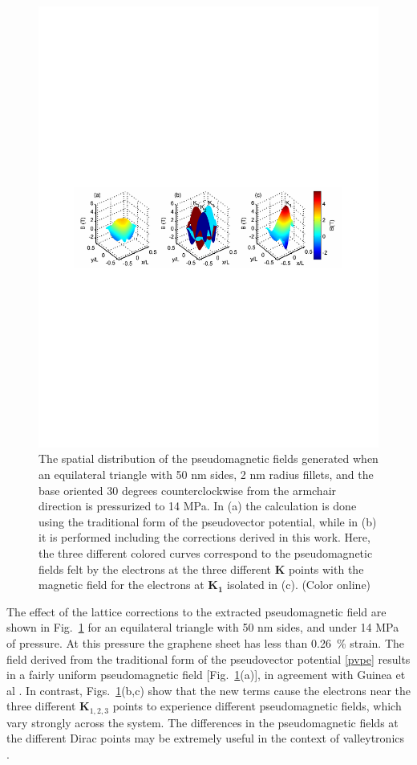 \begin{figure}
\includegraphics{Figs_PVP/figure_3.pdf}
\caption{\label{triholes}The spatial distribution of the pseudomagnetic fields generated when an equilateral triangle with 50 nm sides, 2 nm radius fillets, and the base oriented 30 degrees counterclockwise from the armchair direction is pressurized to 14 MPa. In (a) the calculation is done using the traditional form of the pseudovector potential, while in (b) it is performed including the corrections derived in this work. Here, the three different colored curves correspond to the pseudomagnetic fields felt by the electrons at the three different $\bm{K}$ points with the magnetic field for the electrons at $\bm{K_1}$ isolated in (c). (Color online)}
\end{figure}

The effect of the lattice corrections to the extracted pseudomagnetic field are shown in Fig.~\ref{triholes} for an equilateral triangle with 50 nm sides, and under 14 MPa of pressure.
At this pressure the graphene sheet has less than 0.26~\% strain.
The field derived from the traditional form of the pseudovector potential \eqref{pvpe} results in a fairly uniform pseudomagnetic field [Fig.~\ref{triholes}(a)], in agreement with Guinea et al \cite{Guinea2009}.
In contrast, Figs.~\ref{triholes}(b,c) show that the new terms cause the electrons near the three different $\bm{K}_{1,2,3}$ points to experience different pseudomagnetic fields, which vary strongly across the system.
The differences in the pseudomagnetic fields at the different Dirac points may be extremely useful in the context of valleytronics \cite{Rycerz2007}.

